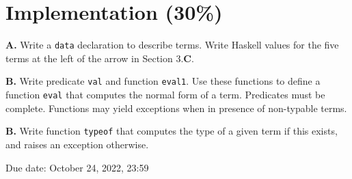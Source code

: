 \documentclass[a4paper]{article}
\begin{document}
\section{Implementation (30\%)}

\textbf{A.} Write a \lstinline|data| declaration to describe terms. Write
Haskell values for the five terms at the left of the arrow in Section 3.\textbf
C.

\textbf{B.} Write predicate \lstinline|val| and function \lstinline|eval1|. Use
these functions to define a function \lstinline|eval| that computes the normal
form of a term. Predicates must be complete. Functions may yield exceptions when
in presence of non-typable terms.

\textbf{B.} Write function \lstinline|typeof| that computes the type of a given
term if this exists, and raises an exception otherwise.

\bigskip Due date: October 24, 2022, 23:59
\end{document}
